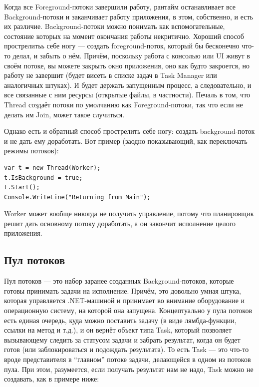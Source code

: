 \documentclass[a5paper]{article}
\begin{document}
Когда все Foreground-потоки завершили работу, рантайм останавливает все Background-потоки и заканчивает работу приложения, в этом, собственно, и есть их различие. Background-потоки можно понимать как вспомогательные, состояние которых на момент окончания работы некритично. Хороший способ прострелитьь себе ногу --- создать foreground-поток, который бы бесконечно что-то делал, и забыть о нём. Причём, поскольку работа с консолью или UI живут в своём потоке, вы можете закрыть окно приложения, оно как будто закроется, но работу не завершит (будет висеть в списке задач в Task Manager или аналогичных штуках). И будет держать запущенным процесс, а следовательно, и все связанные с ним ресурсы (открытые файлы, в частности). Печаль в том, что Thread создаёт потоки по умолчанию как Foreground-потоки, так что если не делать им Join, может такое случиться.

Однако есть и обратный способ прострелить себе ногу: создать background-поток и не дать ему доработать. Вот пример (заодно показывающий, как переключать режимы потоков):

\begin{verbatim}
var t = new Thread(Worker);
t.IsBackground = true;
t.Start();
Console.WriteLine("Returning from Main");
\end{verbatim}

Worker может вообще никогда не получить управление, потому что планировщик решит дать основному потоку доработать, а он закончит исполнение целого приложения.

\subsection{Пул потоков}

Пул потоков --- это набор заранее созданных Background-потоков, которые готовы принимать задачи на исполнение. Причём, это довольно умная штука, которая управляется .NET-машиной и принимает во внимание оборудование и операционную систему, на которой она запущена. Концептуально у пула потоков есть единая очередь, куда можно поставить задачу (в виде лямбда-функции, ссылки на метод и т.д.), и он вернёт объект типа Task, который позволяет вызывающему следить за статусом задачи и забрать результат, когда он будет готов (или заблокироваться и подождать результата). То есть Task --- это что-то вроде представителя в ``главном'' потоке задачи, делающейся в одном из потоков пула. При этом, разумеется, если получать результат нам не надо, Task можно не создавать, как в примере ниже:
\end{document}
